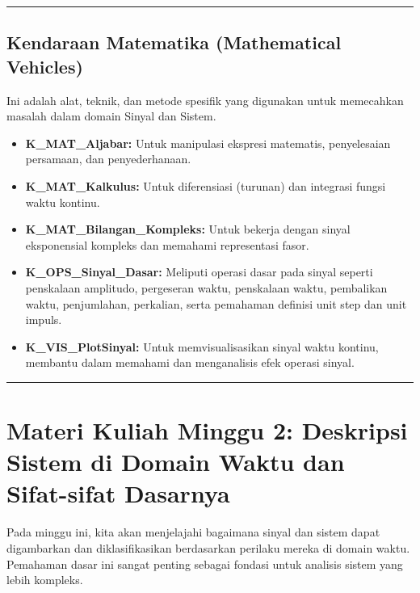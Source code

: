\documentclass[
  letterpaper,
  DIV=11,
  numbers=noendperiod]{scrreprt}
\providecommand{\tightlist}{%
  \setlength{\itemsep}{0pt}\setlength{\parskip}{0pt}}
\begin{document}
\begin{center}\rule{0.5\linewidth}{0.5pt}\end{center}

\section{Kendaraan Matematika (Mathematical
Vehicles)}\label{kendaraan-matematika-mathematical-vehicles}

Ini adalah alat, teknik, dan metode spesifik yang digunakan untuk
memecahkan masalah dalam domain Sinyal dan Sistem.

\begin{itemize}
\tightlist
\item
  \textbf{K\_MAT\_Aljabar:} Untuk manipulasi ekspresi matematis,
  penyelesaian persamaan, dan penyederhanaan.
\item
  \textbf{K\_MAT\_Kalkulus:} Untuk diferensiasi (turunan) dan integrasi
  fungsi waktu kontinu.
\item
  \textbf{K\_MAT\_Bilangan\_Kompleks:} Untuk bekerja dengan sinyal
  eksponensial kompleks dan memahami representasi fasor.
\item
  \textbf{K\_OPS\_Sinyal\_Dasar:} Meliputi operasi dasar pada sinyal
  seperti penskalaan amplitudo, pergeseran waktu, penskalaan waktu,
  pembalikan waktu, penjumlahan, perkalian, serta pemahaman definisi
  unit step dan unit impuls.
\item
  \textbf{K\_VIS\_PlotSinyal:} Untuk memvisualisasikan sinyal waktu
  kontinu, membantu dalam memahami dan menganalisis efek operasi sinyal.
\end{itemize}

\begin{center}\rule{0.5\linewidth}{0.5pt}\end{center}


\chapter{Materi Kuliah Minggu 2: Deskripsi Sistem di Domain Waktu dan
Sifat-sifat
Dasarnya}\label{materi-kuliah-minggu-2-deskripsi-sistem-di-domain-waktu-dan-sifat-sifat-dasarnya}

Pada minggu ini, kita akan menjelajahi bagaimana sinyal dan sistem dapat
digambarkan dan diklasifikasikan berdasarkan perilaku mereka di domain
waktu. Pemahaman dasar ini sangat penting sebagai fondasi untuk analisis
sistem yang lebih kompleks.
\end{document}
